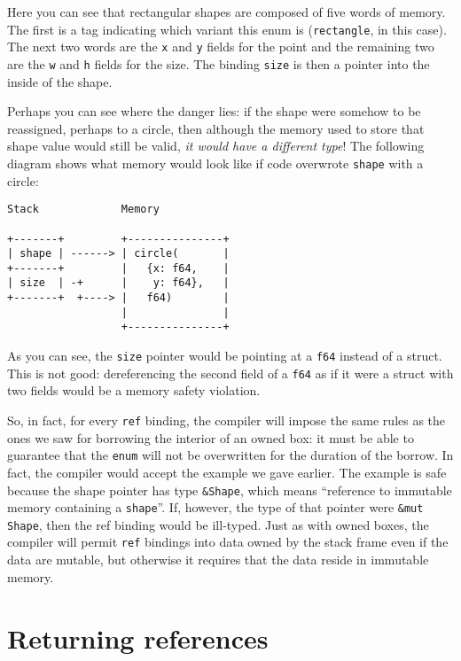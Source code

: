 \documentclass[]{article}
\begin{document}
Here you can see that rectangular shapes are composed of five words of
memory. The first is a tag indicating which variant this enum is
(\texttt{rectangle}, in this case). The next two words are the
\texttt{x} and \texttt{y} fields for the point and the remaining two are
the \texttt{w} and \texttt{h} fields for the size. The binding
\texttt{size} is then a pointer into the inside of the shape.

Perhaps you can see where the danger lies: if the shape were somehow to
be reassigned, perhaps to a circle, then although the memory used to
store that shape value would still be valid, \emph{it would have a
different type}! The following diagram shows what memory would look like
if code overwrote \texttt{shape} with a circle:

\begin{verbatim}
Stack             Memory

+-------+         +---------------+
| shape | ------> | circle(       |
+-------+         |   {x: f64,    |
| size  | -+      |    y: f64},   |
+-------+  +----> |   f64)        |
                  |               |
                  +---------------+
\end{verbatim}

As you can see, the \texttt{size} pointer would be pointing at a
\texttt{f64} instead of a struct. This is not good: dereferencing the
second field of a \texttt{f64} as if it were a struct with two fields
would be a memory safety violation.

So, in fact, for every \texttt{ref} binding, the compiler will impose
the same rules as the ones we saw for borrowing the interior of an owned
box: it must be able to guarantee that the \texttt{enum} will not be
overwritten for the duration of the borrow. In fact, the compiler would
accept the example we gave earlier. The example is safe because the
shape pointer has type \texttt{\&Shape}, which means ``reference to
immutable memory containing a \texttt{shape}''. If, however, the type of
that pointer were \texttt{\&mut Shape}, then the ref binding would be
ill-typed. Just as with owned boxes, the compiler will permit
\texttt{ref} bindings into data owned by the stack frame even if the
data are mutable, but otherwise it requires that the data reside in
immutable memory.

\section{Returning references}\label{returning-references}
\end{document}
